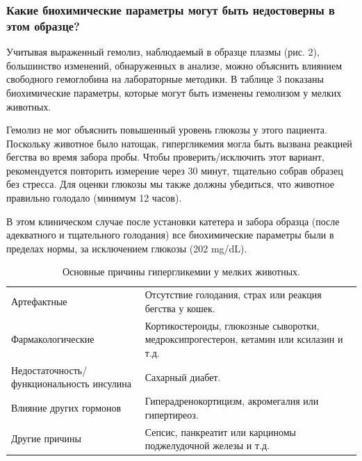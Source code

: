 \documentclass[a4paper,12pt]{book}
\begin{document}
\subsubsection*{Какие биохимические параметры могут быть недостоверны в этом образце?}
Учитывая выраженный гемолиз, наблюдаемый в образце плазмы (рис. 2), большинство изменений, обнаруженных в анализе, можно объяснить влиянием свободного гемоглобина на лабораторные методики. В таблице 3 показаны биохимические параметры, которые могут быть изменены гемолизом у мелких животных.

Гемолиз не мог объяснить повышенный уровень глюкозы у этого пациента. Поскольку животное было натощак, гипергликемия могла быть вызвана реакцией бегства во время забора пробы. Чтобы проверить/исключить этот вариант, рекомендуется повторить измерение через 30 минут, тщательно собрав образец без стресса. Для оценки глюкозы мы также должны убедиться, что животное правильно голодало (минимум 12 часов).

В этом клиническом случае после установки катетера и забора образца (после адекватного и тщательного голодания) все биохимические параметры были в пределах нормы, за исключением глюкозы (202 mg/dL).

\begin{table}[htbp]
\centering
\caption{Основные причины гипергликемии у мелких животных.}
\begin{tabular}{p{6cm}p{8cm}}
\toprule
Артефактные & Отсутствие голодания, страх или реакция бегства у кошек. \\
Фармакологические & Кортикостероиды, глюкозные сыворотки, медроксипрогестерон, кетамин или ксилазин и т.д. \\
Недостаточность/функциональность инсулина & Сахарный диабет. \\
Влияние других гормонов & Гиперадренокортицизм, акромегалия или гипертиреоз. \\
Другие причины & Сепсис, панкреатит или карциномы поджелудочной железы и т.д. \\
\bottomrule
\end{tabular}
\end{table}
\end{document}
